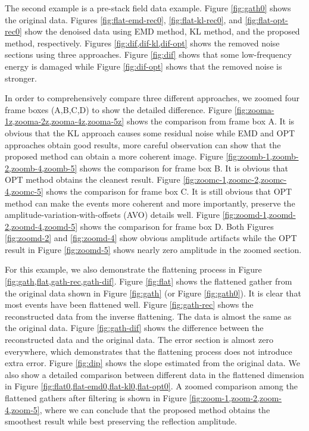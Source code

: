 The second example is a pre-stack field data example. Figure \ref{fig:gath0} shows the original data. Figures \ref{fig:flat-emd-rec0}, \ref{fig:flat-kl-rec0}, and \ref{fig:flat-opt-rec0} show the denoised data using EMD method, KL method, and the proposed method, respectively. Figures \ref{fig:dif,dif-kl,dif-opt} shows the removed noise sections using three approaches. Figure \ref{fig:dif} shows that some low-frequency energy is damaged while Figure \ref{fig:dif-opt} shows that the removed noise is stronger. 

In order to comprehensively compare three different approaches, we zoomed four frame boxes (A,B,C,D) to show the detailed difference. Figure \ref{fig:zooma-1z,zooma-2z,zooma-4z,zooma-5z} shows the comparison from frame box A. It is obvious that the KL approach causes some residual noise while EMD and OPT approaches obtain good results, more careful observation can show that the proposed method can obtain a more coherent image. Figure \ref{fig:zoomb-1,zoomb-2,zoomb-4,zoomb-5} shows the comparison for frame box B. It is obvious that OPT method obtains the cleanest result. Figure \ref{fig:zoomc-1,zoomc-2,zoomc-4,zoomc-5} shows the comparison for frame box C. It is still obvious that OPT method can make the events more coherent and more importantly, preserve the amplitude-variation-with-offsets (AVO) details well. Figure \ref{fig:zoomd-1,zoomd-2,zoomd-4,zoomd-5} shows the comparison for frame box D. Both Figures \ref{fig:zoomd-2} and \ref{fig:zoomd-4} show obvious amplitude artifacts while the OPT result in Figure \ref{fig:zoomd-5} shows nearly zero amplitude in the zoomed section.

For this example, we also demonstrate the flattening process in Figure \ref{fig:gath,flat,gath-rec,gath-dif}. Figure \ref{fig:flat} shows the flattened gather from the original data shown in Figure \ref{fig:gath} (or Figure \ref{fig:gath0}). It is clear that most events have been flattened well. Figure \ref{fig:gath-rec} shows the reconstructed data from the inverse flattening. The data is almost the same as the original data. Figure \ref{fig:gath-dif} shows the difference between the reconstructed data and the original data. The error section is almost zero everywhere, which demonstrates that the flattening process does not introduce extra error.  Figure \ref{fig:dip} shows the slope estimated from the original data.  We also show a detailed comparison between different data in the flattened dimension in Figure \ref{fig:flat0,flat-emd0,flat-kl0,flat-opt0}. A zoomed comparison among the flattened gathers after filtering is shown in Figure \ref{fig:zoom-1,zoom-2,zoom-4,zoom-5}, where we can conclude that the proposed method obtains the smoothest result while best preserving the reflection amplitude.

